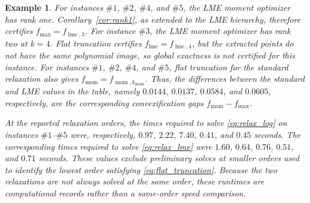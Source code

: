 \documentclass[pdflatex,sn-mathphys-num]{sn-jnl}%
\theoremstyle{thmstyleone}%
\theoremstyle{thmstyletwo}%
\newtheorem{example}{Example}%
\theoremstyle{thmstylethree}%
\begin{document}
\begin{example}
{\color{red}
	For instances $\#1$, $\#2$, $\#4$, and $\#5$, the LME moment
	optimizer has rank one. Corollary~\ref{cor:rank1}, as extended to the
	LME hierarchy, therefore certifies
	$f_{\max}=f_{\operatorname{lme},3}$. For instance $\#3$, the LME
	moment optimizer has rank two at $k=4$. Flat truncation certifies
	$f_{\operatorname{lme}}=f_{\operatorname{lme},4}$, but the extracted
	points do not have the same polynomial image, so global exactness is
	not certified for this instance.
	For instances $\#1$, $\#2$, $\#4$, and $\#5$, flat truncation for the
	standard relaxation also gives
	$f_{\operatorname{mom}}=f_{\operatorname{mom},k_{\operatorname{mom}}}$.
	Thus, the differences between the standard and LME values in the table,
	namely $0.0144$, $0.0137$, $0.0584$, and $0.0605$, respectively, are
	the corresponding convexification gaps
	$f_{\operatorname{mom}}-f_{\max}$.

	At the reported relaxation orders, the times required to solve
	\eqref{eq:relax_log} on instances $\#1$--$\#5$ were, respectively,
	$0.97$, $2.22$, $7.40$, $0.41$, and $0.45$ seconds. The corresponding
	times required to solve \eqref{eq:relax_lme} were
	$1.60$, $0.64$, $0.76$, $0.51$, and $0.71$ seconds. These values
	exclude preliminary solves at smaller orders used to identify the
	lowest order satisfying \eqref{eq:flat_truncation}. Because the two
	relaxations are not always solved at the same order, these runtimes
	are computational records rather than a same-order speed comparison.
}
\end{example}
\end{document}

